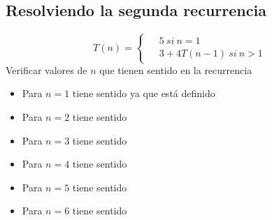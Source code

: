\documentclass[11pt,letterpaper,fleqn]{article}
\begin{document}
\newpage
\subsection{Resolviendo la segunda recurrencia}
\begin{equation*}
	T(n) =
	\begin{cases}
		\begin{aligned}
			&5 \ si \ n = 1\\
			&3 + 4T(n-1) \ si \ n > 1
		\end{aligned}
	\end{cases}
\end{equation*}
Verificar valores de $n$ que tienen sentido en la recurrencia
\begin{itemize}
	\item Para $n=1$ tiene sentido ya que está definido
	\item Para $n=2$ tiene sentido
	\item Para $n=3$ tiene sentido
	\item Para $n=4$ tiene sentido
	\item Para $n=5$ tiene sentido
	\item Para $n=6$ tiene sentido
\end{itemize}
\end{document}
